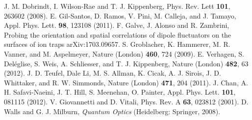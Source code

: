 \documentclass[a4paper]{jpconf}
\begin{document}
\begin{thebibliography}{99}
 J. M. Dobrindt, I. Wilson-Rae and T. J. Kippenberg, Phys. Rev.
Lett \textbf{101}, 263602 (2008).
 E. Gil-Santos, D. Ramos, V. Pini, M. Calleja, and J. Tamayo, Appl. Phys. Lett. \textbf{98}, 123108 (2011).
 F. Galve, J. Alonso and R. Zambrini, Probing the orientation and spatial correlations of dipole fluctuators on the surfaces
of ion traps arXiv:1703.09657.
 S. Groblacher, K. Hammerer, M. R. Vanner, and M. Aspelmeyer, Nature (London) \textbf{460}, 724 (2009).
 E. Verhagen, S. Deléglise, S. Weis, A. Schliesser, and T. J. Kippenberg, Nature (London) \textbf{482}, 63 (2012).
 J. D. Teufel, Dale Li, M. S. Allman, K. Cicak, A. J. Sirois, J. D. Whittaker, and R. W. Simmonds, Nature (London) \textbf{471}, 204 (2011).
 J. Chan, A. H. Safavi-Naeini, J. T. Hill, S. Meenehan, O. Painter, Appl. Phys. Lett. \textbf{101},  081115 (2012).
 V. Giovannetti and D. Vitali, Phys. Rev. A \textbf{63}, 023812 (2001).
 D. Walls and G. J. Milburn, \textit{Quantum Optics} (Heidelberg: Springer, 2008).


\end{thebibliography}
\end{document}
